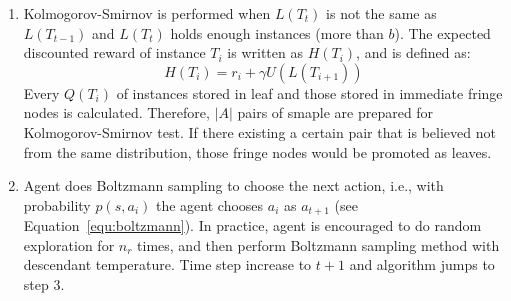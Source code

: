 \documentclass[conference]{IEEEtran}
\begin{document}
\begin{enumerate}
		\item Kolmogorov-Smirnov is performed when $L(T_t)$ is not the same as $L(T_{t-1})$ and
		$L(T_t)$ holds enough instances (more than $b$). The expected discounted reward of instance
		$T_i$ is written as $H(T_i)$, and is defined as:
		\begin{equation}
		H(T_i) = r_i + \gamma U(L(T_{i+1}))
		\end{equation}
		Every $Q(T_i)$ of instances stored in leaf and those stored in immediate fringe nodes is
		calculated. Therefore, $|A|$ pairs of smaple are prepared for Kolmogorov-Smirnov test. If
		there existing a certain pair that is believed not from the same distribution, those
		fringe nodes would be promoted as leaves.
		
		\item Agent does Boltzmann sampling to choose the next action, i.e., with
		probability $p(s, a_i)$ the agent chooses $a_i$ as $a_{t+1}$ (see Equation~\ref{equ:boltzmann}).
		In practice, agent is encouraged to do random exploration for $n_r$ times, and then perform
		Boltzmann sampling method with descendant temperature.
		Time step increase to $t+1$ and algorithm jumps to step 3.
	\end{enumerate}
	
\end{document}
